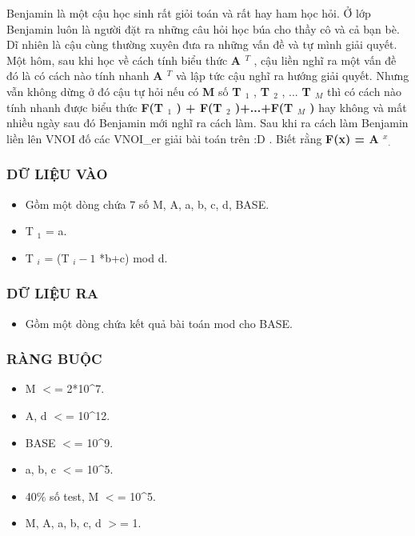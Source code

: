 



   Benjamin là một cậu học sinh rất giỏi toán và rất hay ham học hỏi. Ở lớp Benjamin luôn là người đặt ra những câu hỏi học búa cho thầy cô và cả bạn bè. Dĩ nhiên là cậu cùng thường xuyên đưa ra những vấn đề và tự mình giải quyết. Một hôm, sau khi học về cách tính biểu thức   \textbf{    A    $^     T    $}   , cậu liền nghĩ ra một vấn đề đó là có cách nào tính nhanh   \textbf{    A    $^     T    $}   và lập tức cậu nghĩ ra hướng giải quyết. Nhưng vẫn không dừng ở đó cậu tự hỏi nếu có   \textbf{    M   }   số   \textbf{    T    $_     1    $}   ,   \textbf{    T    $_     2    $}   , ...   \textbf{    T    $_     M    $}   thì có cách nào tính nhanh được biểu thức   \textbf{    F(T    $_     1    $    ) + F(T    $_     2    $    )+...+F(T    $_     M    $    )   }   hay không và mất nhiều ngày sau đó Benjamin mới nghĩ ra cách làm. Sau khi ra cách làm Benjamin liền lên VNOI đố các VNOI\_er giải bài toán trên :D . Biết rằng   \textbf{    F(x) = A    $^     x    $}$_    .   $

\subsubsection{   DỮ LIỆU VÀO  }


\begin{itemize}
	\item     Gồm một dòng chứa 7 số M, A, a, b, c, d, BASE.   
	\item     T    $_     1    $    = a.   
	\item     T    $_     i    $    = (T    $_     i-1    $    *b+c) mod d.   
\end{itemize}



\subsubsection{   DỮ LIỆU RA  }
\begin{itemize}
	\item     Gồm một dòng chứa kết quả bài toán mod cho BASE.   
\end{itemize}

\subsubsection{   RÀNG BUỘC  }


\begin{itemize}
	\item     M $<$= 2*10\textasciicircum7.   
	\item     A, d $<$= 10\textasciicircum12.   
	\item     BASE $<$= 10\textasciicircum9.   
	\item     a, b, c $<$= 10\textasciicircum5.   
	\item     40\% số test, M $<$= 10\textasciicircum5.   
	\item     M, A, a, b, c, d $>$= 1.   
\end{itemize}



